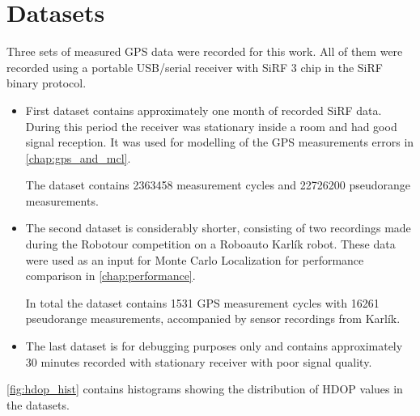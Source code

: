 \chapter{Datasets}
\label{chap:datasets}

Three sets of measured GPS data were recorded for this work.
All of them were recorded using a portable USB/serial receiver with SiRF 3 chip
in the SiRF binary protocol.

\begin{itemize}

\item
First dataset contains approximately one month of recorded SiRF data.
During this period the receiver was stationary inside a room and had good signal 
reception. 
It was used for modelling of the GPS measurements errors in \autoref{chap:gps_and_mcl}.

The dataset contains \num{2363458} measurement cycles and
\num{22726200} pseudorange measurements.

\item
The second dataset is considerably shorter, consisting of two recordings made during
the Robotour competition \cite{robotour} on a Roboauto Karlík \cite{karlik} robot.
These data were used as an input for Monte Carlo Localization for performance comparison in \autoref{chap:performance}.

In total the dataset contains \num{1531} GPS measurement cycles with
\num{16261} pseudorange measurements, accompanied by sensor recordings from Karlík.

\item
The last dataset is for debugging purposes only and contains approximately
30 minutes recorded with stationary receiver with poor signal quality.

\end{itemize}

\autoref{fig:hdop_hist} contains histograms showing the distribution of HDOP values in the datasets.

